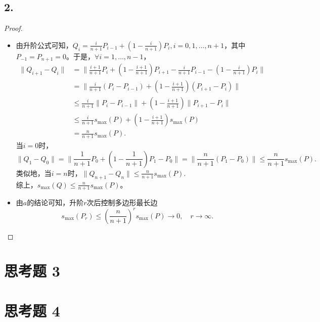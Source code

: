 \documentclass[utf8]{ctexart}
\begin{document}
\subsection*{2.}
\begin{proof}
    \begin{itemize}
        \item %
        由升阶公式可知，$Q_{i} = \frac{i}{n+1}P_{i-1} + (1-\frac{i}{n+1})P_i,i=0,1,\dots,n+1$，其中$P_{-1}=P_{n+1}=0$。于是，$\forall i = 1,\dots,n-1$，
        $$
        \begin{aligned}
        \|Q_{i+1} - Q_i\| &= \|\frac{i+1}{n+1}P_i + (1-\frac{i+1}{n+1})P_{i+1} - \frac{i}{n+1}P_{i-1} - (1-\frac{i}{n+1})P_{i}\|\\
        &= \|\frac{i}{n+1}(P_i-P_{i-1}) + (1-\frac{i+1}{n+1})(P_{i+1}-P_i)\|\\
        &\leq \frac{i}{n+1}\|P_i-P_{i-1}\| + (1-\frac{i+1}{n+1})\|P_{i+1}-P_i\|\\
        &\leq \frac{i}{n+1} s_{\max}(P) + (1-\frac{i+1}{n+1})s_{\max}(P)\\
        &= \frac{n}{n+1} s_{\max}(P).
        \end{aligned}
        $$
        当$i=0$时，
        $$
        \|Q_1-Q_0\| = \|\frac{1}{n+1}P_0  + (1-\frac{1}{n+1})P_1 - P_0\| = \|\frac{n}{n+1}(P_1 - P_0)\| \leq \frac{n}{n+1}s_{\max}(P).
        $$
        类似地，当$i=n$时，$\|Q_{n+1}-Q_n\| \leq \frac{n}{n+1}s_{\max}(P)$.\\
        综上，$s_{\max}(Q)\leq \frac{n}{n+1}s_{\max}(P)$。
        \item %
        由$a$的结论可知，升阶$r$次后控制多边形最长边
        $$
        s_{\max}(P_r) \leq (\frac{n}{n+1})^r s_{\max}(P) \to 0, \quad r \to \infty.
        $$
    \end{itemize}
\end{proof}

\section*{思考题 3}


\section*{思考题 4}
\end{document}
